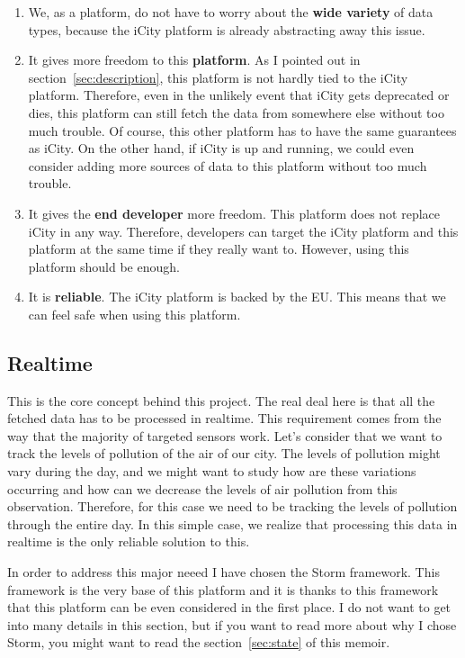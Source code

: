 \begin{enumerate}
  \itemsep0em
  \item We, as a platform, do not have to worry about the {\bf wide variety} of
data types, because the iCity platform is already abstracting away this issue.
  \item It gives more freedom to this {\bf platform}. As I pointed out in
section~\ref{sec:description}, this platform is not hardly tied to the iCity
platform. Therefore, even in the unlikely event that iCity gets deprecated or
dies, this platform can still fetch the data from somewhere else without too
much trouble. Of course, this other platform has to have the same guarantees as
iCity. On the other hand, if iCity is up and running, we could even consider
adding more sources of data to this platform without too much trouble.
  \item It gives the {\bf end developer} more freedom. This platform does not
replace iCity in any way. Therefore, developers can target the iCity platform
and this platform at the same time if they really want to. However, using this
platform should be enough.
  \item It is {\bf reliable}. The iCity platform is backed by the EU. This
means that we can feel safe when using this platform.
\end{enumerate}

\subsection{Realtime}

This is the core concept behind this project. The real deal here is that all
the fetched data has to be processed in realtime. This requirement comes from
the way that the majority of targeted sensors work. Let's consider that we want
to track the levels of pollution of the air of our city. The levels of
pollution might vary during the day, and we might want to study how are these
variations occurring and how can we decrease the levels of air pollution from
this observation. Therefore, for this case we need to be tracking the levels of
pollution through the entire day. In this simple case, we realize that
processing this data in realtime is the only reliable solution to this.

In order to address this major neeed I have chosen the Storm framework. This
framework is the very base of this platform and it is thanks to this framework
that this platform can be even considered in the first place. I do not
want to get into many details in this section, but if you want to read more
about why I chose Storm, you might want to read the section~\ref{sec:state} of
this memoir.
